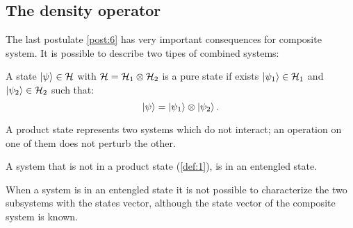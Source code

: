     \subsection{The density operator}
    \label{TheDensOp}
    The last postulate \ref{post:6} has very important consequences for composite system. It is possible
    to describe two tipes of combined systems:

    \begin{definition}
        A state $\ket{\psi}\in\mathcal{H}$ with $\mathcal{H}=\mathcal{H}_1\otimes\mathcal{H}_2$ is a
        pure state if exists $\ket{\psi_1}\in\mathcal{H}_1$ and $\ket{\psi_2}\in\mathcal{H}_2$
        such that:
        \begin{equation*}
            \ket{\psi}=\ket{\psi_1}\otimes\ket{\psi_2}.
        \end{equation*}
        \label{def:1}
    \end{definition}
    A product state represents two systems which do not interact; an operation on one of 
    them does not perturb the other.

    \begin{definition}
        A system that is not in a product state (\ref{def:1}), is in an entengled state. 
        \label{def:2}
    \end{definition}
    When a system is in an entengled state it is not possible to characterize the two subsystems
    with the states vector, although the state vector of the composite system is known.

